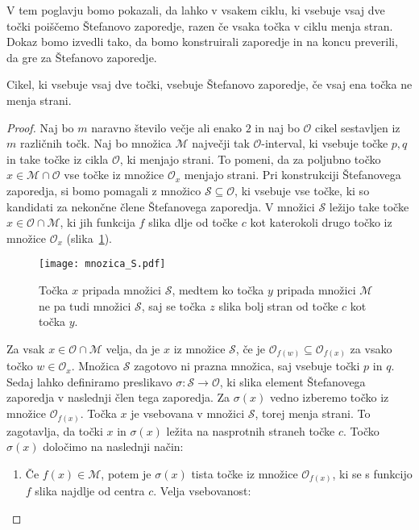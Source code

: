 \documentclass[../TG_magistrsko_delo_sections.tex]{subfiles}
\begin{document}
V tem poglavju bomo pokazali, da lahko v vsakem ciklu, ki vsebuje vsaj dve točki poiščemo Štefanovo zaporedje, razen če vsaka točka v ciklu menja stran. Dokaz bomo izvedli tako, da bomo konstruirali zaporedje in na koncu preverili, da gre za Štefanovo zaporedje.
\begin{trditev}
Cikel, ki vsebuje vsaj dve točki, vsebuje Štefanovo zaporedje, če vsaj ena točka ne menja strani.
\end{trditev}
\begin{proof}
Naj bo $m$ naravno število večje ali enako $2$ in naj bo $\mathcal{O}$ cikel sestavljen iz $m$ različnih točk. Naj bo množica $\mathcal{M}$ največji tak $\mathcal{O}$-interval, ki vsebuje točke $p, q$ in take točke iz cikla $\mathcal{O}$, ki menjajo strani. To pomeni, da za poljubno točko $x \in \mathcal{M} \cap \mathcal{O}$ vse točke iz množice $\mathcal{O}_x$ menjajo strani. Pri konstrukciji Štefanovega zaporedja, si bomo pomagali z množico $\mathcal{S} \subseteq \mathcal{O}$, ki vsebuje vse točke, ki so kandidati za nekončne člene Štefanovega zaporedja. V množici $\mathcal{S}$ ležijo take točke $x \in \mathcal{O} \cap \mathcal{M}$, ki jih funkcija $f$ slika dlje od točke $c$ kot katerokoli drugo točko iz množice $\mathcal{O}_x$ (slika~\ref{fig:S}). 
\begin{figure}[h]
  \centering
  \texttt{[image: mnozica\_S.pdf]}
  \caption[Konstrukcija množice S.]{Točka $x$ pripada množici $\mathcal{S}$, medtem ko točka $y$ pripada množici $\mathcal{M}$ ne pa tudi množici $\mathcal{S}$, saj se točka $z$ slika bolj stran od točke $c$ kot točka $y$.}
  \label{fig:S}
\end{figure}
Za vsak $x \in \mathcal{O} \cap \mathcal{M}$ velja, da je $x$ iz množice $\mathcal{S}$, če je $\mathcal{O}_{f(w)} \subseteq \mathcal{O}_{f(x)}$ za vsako točko $w \in \mathcal{O}_x$. Množica $\mathcal{S}$ zagotovo ni prazna množica, saj vsebuje točki $p$ in $q$. Sedaj lahko definiramo preslikavo $\sigma : \mathcal{S} \to \mathcal{O}$, ki slika element Štefanovega zaporedja v naslednji člen tega zaporedja. Za $\sigma(x)$ vedno izberemo točko iz množice $\mathcal{O}_{f(x)}$. Točka $x$ je vsebovana v množici $\mathcal{S}$, torej menja strani. To zagotavlja, da točki $x$ in $\sigma(x)$ ležita na nasprotnih straneh točke $c$. Točko $\sigma(x)$ določimo na naslednji način:
\begin{enumerate}[label={(\arabic*)}]
\item\label{def:sigma1} Če $f(x) \in \mathcal{M}$, potem je $\sigma(x)$ tista točke iz množice $\mathcal{O}_{f(x)}$, ki se s funkcijo $f$ slika najdlje od centra $c$. Velja vsebovanost:

\end{enumerate}
\end{proof}
\end{document}

